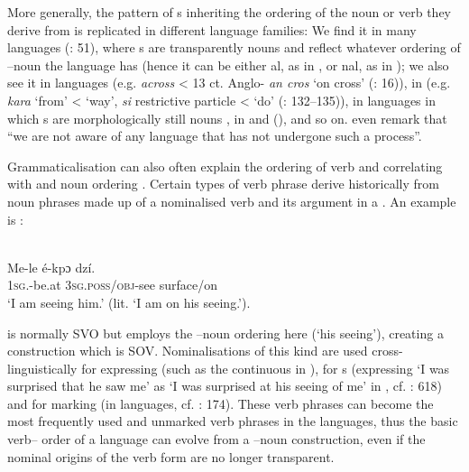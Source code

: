 \documentclass[output=paper]{langsci/langscibook}
\begin{document}
More generally, the pattern of s inheriting the ordering of the noun or verb they derive from is replicated in different language families: We find it in many  languages (\citealt{LynchEtAl2002}: 51), where s are transparently nouns and reflect whatever ordering of –noun the language has (hence it can be either al, as in , or nal, as in ); we also see it in  languages (e.g.  \textit{across} < 13 ct. Anglo- \textit{an cros} ‘on cross’ (\citealt{BordetJamet2010}: 16)), in  (e.g. \textit{kara} ‘from’ < ‘way’, \textit{si} restrictive particle < ‘do’ (\citealt{Frellesvig2010}: 132–135)), in  languages in which s are morphologically still nouns \citep{Dixon2002}, in  and  (\citealt{DeLancey1997}), and so on. \citet[62]{HeineKuteva2007} even remark that “we are not aware of any language that has not undergone such a process”.

Grammaticalisation can also often explain the ordering of verb and  correlating with  and noun ordering \citep{Dryer2011}. Certain types of verb phrase derive historically from noun phrases made up of a nominalised verb and its  argument in a . An example is :

\ea

\\
\gll Me-le       é-kpɔ     dzí.\\
     \textsc{1sg}.-be.at  3\textsc{sg.poss/obj-}see   surface/on\\
\glt ‘I am seeing him.’ (lit. ‘I am on his seeing.’).
\z

 is normally SVO but employs the –noun ordering here (‘his seeing’), creating a construction which is SOV. Nominalisations of this kind are used cross-linguistically for expressing  (such as the continuous  in ), for s (expressing ‘I was surprised that he saw me’ as ‘I was surprised at his seeing of me’ in , cf. \citealt{Ogloblin2005}: 618) and for  marking (in  languages, cf. \citealt{Himmelmann2005}: 174). These verb phrases can become the most frequently used and unmarked verb phrases in the languages, thus the basic verb– order of a language can evolve from a –noun construction, even if the nominal origins of the verb form are no longer transparent. 
\end{document}
